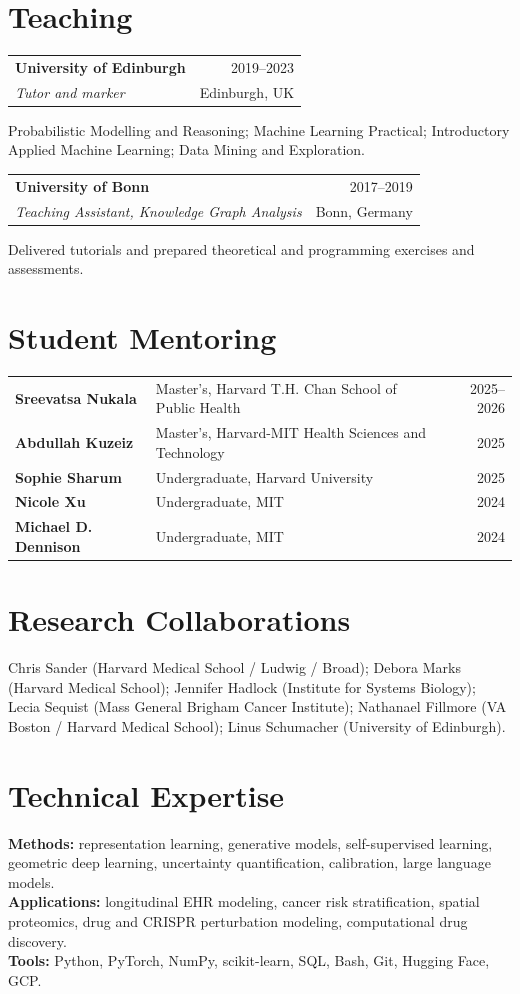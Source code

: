 \documentclass[10pt,a4paper]{article}
\makeatletter
\newcommand{\entry}[4]{%
  \par\noindent\begin{tabularx}{\textwidth}{@{}Xr@{}}
    \textbf{#1} & \color{muted}#2 \\
    \textit{#3} & \color{muted}#4
  \end{tabularx}\par\vspace{3pt}
}
\makeatother
\begin{document}
\section{Teaching}
\entry{University of Edinburgh}{2019--2023}{Tutor and marker}{Edinburgh, UK}
Probabilistic Modelling and Reasoning; Machine Learning Practical; Introductory Applied Machine Learning; Data Mining and Exploration.
\entry{University of Bonn}{2017--2019}{Teaching Assistant, Knowledge Graph Analysis}{Bonn, Germany}
Delivered tutorials and prepared theoretical and programming exercises and assessments.

\section{Student Mentoring}
\begin{tabularx}{\textwidth}{@{}lXr@{}}
\textbf{Sreevatsa Nukala} & Master's, Harvard T.H. Chan School of Public Health & 2025--2026 \\
\textbf{Abdullah Kuzeiz} & Master's, Harvard-MIT Health Sciences and Technology & 2025 \\
\textbf{Sophie Sharum} & Undergraduate, Harvard University & 2025 \\
\textbf{Nicole Xu} & Undergraduate, MIT & 2024 \\
\textbf{Michael D. Dennison} & Undergraduate, MIT & 2024
\end{tabularx}

\section{Research Collaborations}
Chris Sander (Harvard Medical School / Ludwig / Broad); Debora Marks (Harvard Medical School); Jennifer Hadlock (Institute for Systems Biology); Lecia Sequist (Mass General Brigham Cancer Institute); Nathanael Fillmore (VA Boston / Harvard Medical School); Linus Schumacher (University of Edinburgh).

\section{Technical Expertise}
\textbf{Methods:} representation learning, generative models, self-supervised learning, geometric deep learning, uncertainty quantification, calibration, large language models.\\
\textbf{Applications:} longitudinal EHR modeling, cancer risk stratification, spatial proteomics, drug and CRISPR perturbation modeling, computational drug discovery.\\
\textbf{Tools:} Python, PyTorch, NumPy, scikit-learn, SQL, Bash, Git, Hugging Face, GCP.
\end{document}
